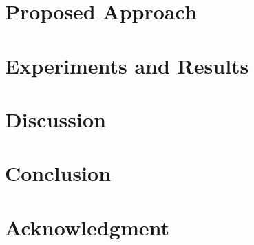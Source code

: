 \documentclass[conference]{IEEEtran} %
\begin{document}
\section{Proposed Approach}
\label{sec:proposed_approach}

\section{Experiments and Results}
\label{sec:experiments}

\section{Discussion}
\label{sec:discussion}

\section{Conclusion}
\label{sec:conclusion}

\section*{Acknowledgment}
\end{document}
